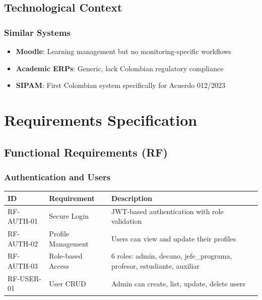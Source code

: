 \documentclass[12pt,a4paper]{report}
\begin{document}
\section{Technological Context}

\subsection{Similar Systems}
\begin{itemize}
    \item \textbf{Moodle}: Learning management but no monitoring-specific workflows
    \item \textbf{Academic ERPs}: Generic, lack Colombian regulatory compliance
    \item \textbf{SIPAM}: First Colombian system specifically for Acuerdo 012/2023
\end{itemize}

\chapter{Requirements Specification}

\section{Functional Requirements (RF)}

\subsection{Authentication and Users}
\begin{longtable}{|p{2cm}|p{4cm}|p{7cm}|}
\hline
\textbf{ID} & \textbf{Requirement} & \textbf{Description} \\
\hline
\endfirsthead
RF-AUTH-01 & Secure Login & JWT-based authentication with role validation \\
\hline
RF-AUTH-02 & Profile Management & Users can view and update their profiles \\
\hline
RF-AUTH-03 & Role-based Access & 6 roles: admin, decano, jefe\_programa, profesor, estudiante, auxiliar \\
\hline
RF-USER-01 & User CRUD & Admin can create, list, update, delete users \\
\hline
\end{longtable}
\end{document}
